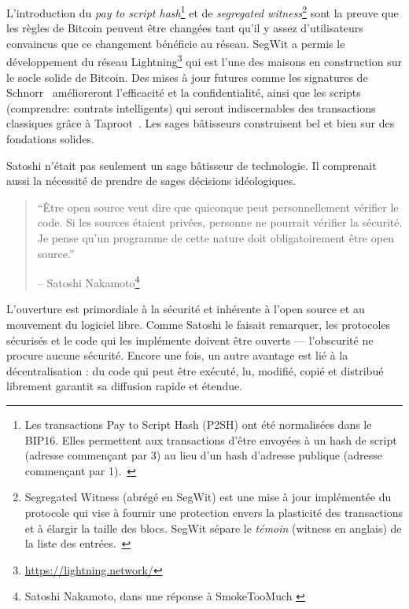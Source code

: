 L'introduction du \textit{pay to script hash}\footnote{Les transactions Pay to
Script Hash (P2SH) ont été normalisées dans le BIP16. Elles permettent aux
transactions d'être envoyées à un hash de script (adresse commençant par 3) au
lieu d'un hash d'adresse publique (adresse commençant par
1).~\cite{btcwiki:p2sh}} et de \textit{segregated witness}\footnote{Segregated
Witness (abrégé en SegWit) est une mise à jour implémentée du protocole qui vise
à fournir une protection envers la plasticité des transactions et à élargir la
taille des blocs. SegWit sépare le \textit{témoin} (witness en anglais) de la
liste des entrées.~\cite{btcwiki:segwit}} sont la preuve que les règles de
Bitcoin peuvent être changées tant qu'il y assez d'utilisateurs convaincus que
ce changement bénéficie au réseau. SegWit a permis le développement du réseau
Lightning\footnote{\url{https://lightning.network/}} qui est l'une des maisons
en construction sur le socle solide de Bitcoin. Des mises à jour futures comme
les signatures de Schnorr~\cite{bip:schnorr} amélioreront l'efficacité et la
confidentialité, ainsi que les scripts (comprendre: contrats intelligents) qui
seront indiscernables des transactions classiques grâce à
Taproot~\cite{taproot}. Les sages bâtisseurs construisent bel et bien sur des
fondations solides.

Satoshi n'était pas seulement un sage bâtisseur de technologie. Il comprenait
aussi la nécessité de prendre de sages décisions idéologiques.

\begin{quotation}\begin{samepage}
\enquote{Être open source veut dire que quiconque peut personnellement vérifier
le code. Si les sources étaient privées, personne ne pourrait vérifier la
sécurité. Je pense qu'un programme de cette nature doit obligatoirement être
open source.}
\begin{flushright} -- Satoshi Nakamoto\footnote{Satoshi Nakamoto, dans une
réponse à SmokeTooMuch \cite{satoshi-open-source}}
\end{flushright}\end{samepage}\end{quotation}

L'ouverture est primordiale à la sécurité et inhérente à l'open source et au
mouvement du logiciel libre. Comme Satoshi le faisait remarquer, les protocoles
sécurisés et le code qui les implémente doivent être ouverts --- l'obscurité ne
procure aucune sécurité. Encore une fois, un autre avantage est lié à la
décentralisation : du code qui peut être exécuté, lu, modifié, copié et
distribué librement garantit sa diffusion rapide et étendue.

